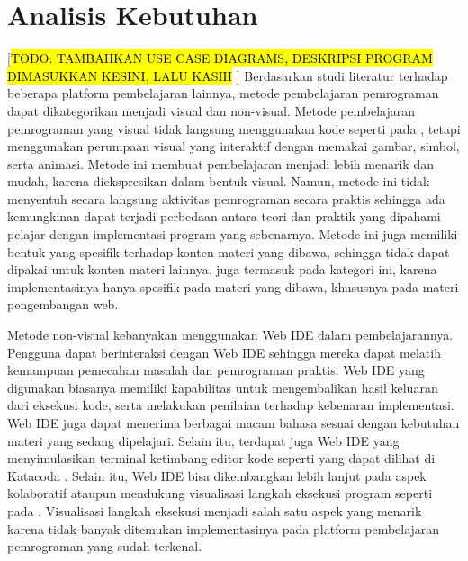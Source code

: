 
\section{Analisis Kebutuhan}
 [\hl{TODO: TAMBAHKAN USE CASE DIAGRAMS, DESKRIPSI PROGRAM DIMASUKKAN KESINI, LALU KASIH }]
Berdasarkan studi literatur terhadap beberapa platform pembelajaran lainnya, metode pembelajaran pemrograman dapat dikategorikan menjadi visual dan non-visual. Metode pembelajaran pemrograman yang visual tidak langsung menggunakan kode seperti pada \textcite{brilliant2021media}, tetapi menggunakan perumpaan visual yang interaktif dengan memakai gambar, simbol, serta animasi. Metode ini membuat pembelajaran menjadi lebih menarik dan mudah, karena diekspresikan dalam bentuk visual. Namun, metode ini tidak menyentuh secara langsung aktivitas pemrograman secara praktis sehingga ada kemungkinan dapat terjadi perbedaan antara teori dan praktik yang dipahami pelajar dengan implementasi program yang sebenarnya. Metode ini juga memiliki bentuk yang spesifik terhadap konten materi yang dibawa, sehingga tidak dapat dipakai untuk konten materi lainnya. \textcite{froggy2021media} juga termasuk pada kategori ini, karena implementasinya hanya spesifik pada materi yang dibawa, khususnya pada materi pengembangan web.

Metode non-visual kebanyakan menggunakan Web IDE dalam pembelajarannya. Pengguna dapat berinteraksi dengan Web IDE sehingga mereka dapat melatih kemampuan pemecahan masalah dan pemrograman praktis. Web IDE yang digunakan biasanya memiliki kapabilitas untuk mengembalikan hasil keluaran dari eksekusi kode, serta melakukan penilaian terhadap kebenaran implementasi. Web IDE juga dapat menerima berbagai macam bahasa sesuai dengan kebutuhan materi yang sedang dipelajari. Selain itu, terdapat juga Web IDE yang menyimulasikan terminal ketimbang editor kode seperti yang dapat dilihat di Katacoda \parencite{katacoda2021media}. Selain itu, Web IDE bisa dikembangkan lebih lanjut pada aspek kolaboratif \parencite{tran2013interactive} ataupun mendukung visualisasi langkah eksekusi program seperti pada \textcite{guo2013pythontutor}. Visualisasi langkah eksekusi menjadi salah satu aspek yang menarik karena tidak banyak ditemukan implementasinya pada platform pembelajaran pemrograman yang sudah terkenal.

